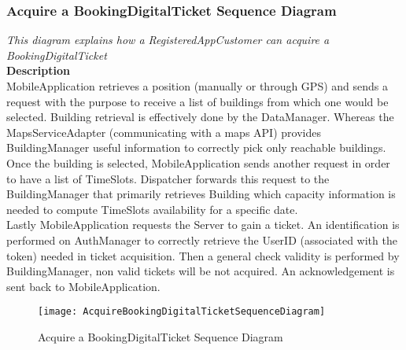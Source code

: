 \newpage
\subsubsection{Acquire a BookingDigitalTicket Sequence Diagram}
\textit{This diagram explains how a RegisteredAppCustomer can acquire a BookingDigitalTicket\\}
\textbf{Description\\}
MobileApplication retrieves a position (manually or through GPS) and sends a request with the purpose to receive a list of buildings from which one would be selected.
Building retrieval is effectively done by the DataManager. Whereas the MapsServiceAdapter (communicating with a maps API) provides BuildingManager useful information to correctly pick only reachable buildings.\\
Once the building is selected, MobileApplication sends another request in order to have a list of TimeSlots. Dispatcher forwards this request to the BuildingManager that primarily retrieves Building which capacity information is needed to compute TimeSlots availability for a specific date.\\
Lastly MobileApplication requests the Server to gain a ticket. An identification is performed on AuthManager to correctly retrieve the UserID (associated with the token) needed in ticket acquisition. Then a general check validity is performed by BuildingManager, non valid tickets will be not acquired. An acknowledgement is sent back to MobileApplication.

\begin{figure}[H]
 \centering
 \texttt{[image: AcquireBookingDigitalTicketSequenceDiagram]}
 \caption{ Acquire a BookingDigitalTicket Sequence Diagram}
 \end{figure}

\newpage
